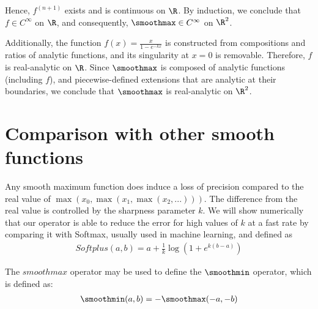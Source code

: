 Hence, $f^{(n+1)}$ exists and is continuous on $\R$. By induction, we conclude that $f \in C^\infty$ on $\R$, and consequently, $\smoothmax \in C^\infty$ on $\R^2$.

\smallConclusion

Additionally, the function $f(x) = \frac{x}{1 - e^{-kx}}$ is constructed from compositions and ratios of analytic functions, and its singularity at $x = 0$ is removable. Therefore, $f$ is real-analytic on $\R$. Since $\smoothmax$ is composed of analytic functions (including $f$), and piecewise-defined extensions that are analytic at their boundaries, we conclude that $\smoothmax$ is real-analytic on $\R^2$.

\section{Comparison with other smooth functions}

Any smooth maximum function does induce a loss of precision compared to the real value of $\max(x_0, \max(x_1, \max(x_2, ...)))$. The difference from the real value is controlled by the sharpness parameter $k$. We will show numerically that our operator is able to reduce the error for high values of $k$ at a fast rate by comparing it with  Softmax, usually used in machine learning, and defined as
\begin{align}
    Softplus(a, b) = a + \frac{1}{k} \log \left(1 + e^{k(b - a)} \right)
\end{align}






The $smoothmax$ operator may be used to define the $\smoothmin$ operator, which is defined as:
\begin{align}
    \smoothmin(a, b) = -\smoothmax(-a, -b)
\end{align}









